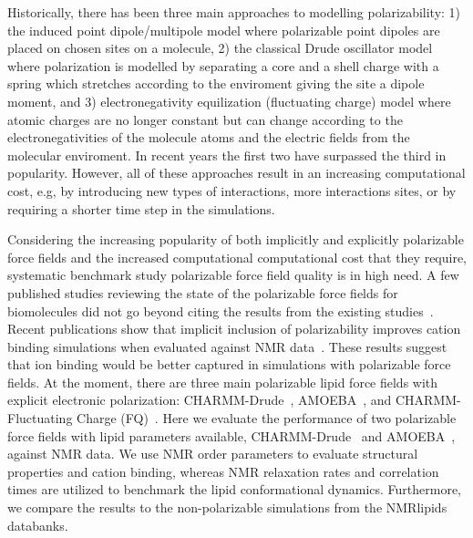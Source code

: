 \documentclass[journal=jacsat,manuscript=article,layout=singlecolumn]{achemso}
\begin{document}
Historically, there has been three main approaches to modelling polarizability: 1) the induced point dipole/multipole model where polarizable point dipoles are placed on chosen sites on a molecule, 2) the classical Drude oscillator model where polarization is modelled by separating a core and a shell charge with a spring which stretches according to the enviroment giving the site a dipole moment, and 3) electronegativity equilization (fluctuating charge) model where atomic charges are no longer constant but can change according to the electronegativities of the molecule atoms and the electric fields from the molecular enviroment. In recent years the first two have surpassed the third in popularity. However, all of these approaches result in an increasing computational cost, e.g, by introducing new types of interactions, more interactions sites, or by requiring a shorter time step in the simulations.





Considering the increasing popularity of both implicitly and explicitly polarizable force fields and the increased computational computational cost that they require, systematic benchmark study polarizable force field quality is in high need. A few published studies reviewing the state of the polarizable force fields for biomolecules did not go beyond citing the results from the existing studies~\cite{inakollu2020polarisable,jin,baker2015polarizable}. Recent publications show that implicit inclusion of polarizability improves cation binding simulations when evaluated against NMR data~\cite{Melcr:2018a, melcr2019improved}. These results suggest that ion binding would be better captured in simulations with polarizable force fields. 
At the moment, there are three main polarizable lipid force fields with explicit electronic polarization: CHARMM-Drude~\cite{li2017drude}, AMOEBA~\cite{chu2018anionicpolarizable,chu2018polarizable}, and CHARMM-Fluctuating Charge (FQ)~\cite{lucas2012charge}. 
Here we evaluate the performance of two polarizable force fields with lipid parameters available, CHARMM-Drude~\cite{li2017drude} and AMOEBA~\cite{chu2018anionicpolarizable,chu2018polarizable}, against NMR data. We use NMR order parameters to evaluate  structural properties and cation binding, whereas NMR relaxation rates and correlation times are utilized to benchmark the lipid conformational dynamics. Furthermore, we compare the results to the non-polarizable simulations from the NMRlipids databanks.
\end{document}
